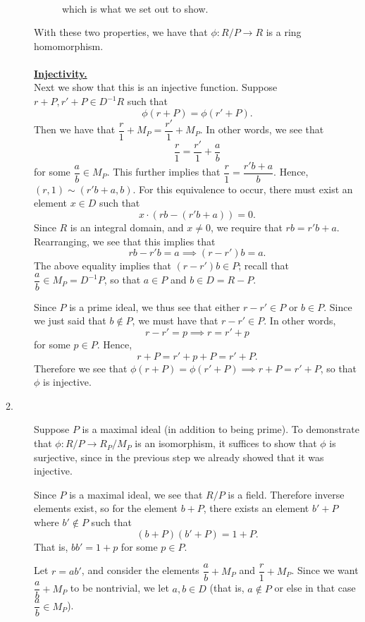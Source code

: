 \begin{prf}
\begin{description}
\begin{description}
\begin{align*}
        \end{align*}
        which is what we set out to show. 
    \end{description}
    With these two properties, we have that $\phi: R/P \to
    R$ is a ring homomorphism.
    \\
    \\
    \underline{\textbf{Injectivity.}}\\
    Next we show that this is an injective function. Suppose $r +
    P,r' + P \in D^{-1}R$ such that 
    \[
        \phi(r + P)= \phi(r' + P).
    \]
    Then we have that $\dfrac{r}{1} + M_P = \dfrac{r'}{1} + M_P$. In
    other words, we see that 
    \[
        \frac{r}{1} = \frac{r'}{1} + \frac{a}{b}
    \]
    for some $\dfrac{a}{b} \in M_P$. This further implies that
    $\dfrac{r}{1} = \dfrac{r'b + a}{b}$. Hence, $(r, 1) \sim (r'b
    + a, b)$. For this equivalence to
    occur, there must exist an element $x \in D$ such that 
    \[
        x\cdot(rb - (r'b + a)) = 0.
    \]   
    Since $R$ is an integral domain, and $x \ne 0$, we require
    that $rb = r'b + a$. Rearranging, we see that this implies
    that 
    \[
        rb - r'b = a \implies (r - r')b = a.
    \]
    The above equality implies that $(r - r')b \in P$; recall that
    $\dfrac{a}{b} \in M_P = D^{-1}P$, so that $a \in P$
    and $b \in D = R - P$. 
    
    Since $P$ is a prime ideal, we thus see that either $r -
    r' \in P$ or $b \in P$. Since we just said that $b \not\in P$,
    we must have that $r - r' \in P.$ In other words, 
    \[
        r - r' = p \implies r = r' + p
    \]
    for some $p \in P$. Hence, 
    \[
        r + P = r' + p + P = r' + P.   
    \]
    Therefore we see that $\phi(r + P) = \phi(r' + P) \implies r +
    P = r' + P$, so that $\phi$ is injective.

    \item[2.] Suppose $P$ is a maximal ideal (in addition to being
    prime). To demonstrate that $\phi: R/P \to R_P/M_P$ is an
    isomorphism, it suffices to show that $\phi$ is surjective,
    since in the previous step we already showed that it was
    injective. 

    Since $P$ is a maximal ideal, we see
    that $R/P$ is a field. Therefore inverse elements exist, so
    for the element $b + P$, there exists an element $b' + P$
    where $b' \not\in P$ such that 
    \[
        (b + P)(b' + P) =  1 + P.
    \]
    That is, $bb' = 1 + p$ for some $p \in P$. 

    Let $r = ab'$, and consider the elements $\dfrac{a}{b} + M_P$
    and $\dfrac{r}{1} + M_P$. Since we want $\dfrac{a}{b} + M_P$
    to be nontrivial, we let $a, b \in D$ (that is, $a \not\in P$
    or else in that case $\dfrac{a}{b} \in M_P$).
    

\end{description}
\end{prf}
